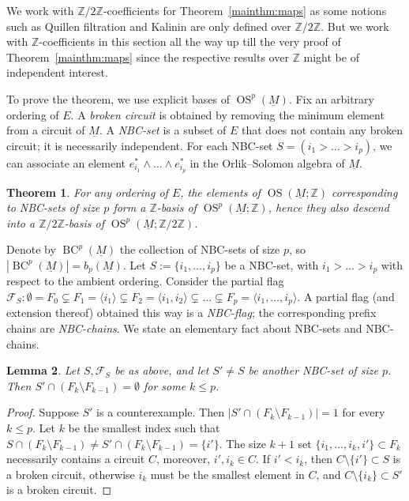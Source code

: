 \documentclass{amsart}
\newtheorem{theorem}{Theorem}[section]
\newtheorem{lemma}[theorem]{Lemma}
\newcommand\Fcal{{\mathcal F}}
\newcommand\ZZ{{\mathbb Z}}
\newcommand\Ztwo{{\mathbb Z}/2{\mathbb Z}}
\DeclareMathOperator{\OS}{OS}
\DeclareMathOperator{\BC}{BC}
\begin{document}
{We work with $\Ztwo$-coefficients for Theorem~\ref{mainthm:maps} as some notions such as Quillen filtration and Kalinin are only defined over $\Ztwo$. But we work with $\ZZ$-coefficients in this section all the way up till the very proof of Theorem~\ref{mainthm:maps} since the respective results over $\ZZ$ might be of independent interest. 

To prove the theorem, we use explicit bases of $\OS^p(\underline{M})$. 
Fix an arbitrary ordering of $E$.
A {\em broken circuit} is obtained by removing the minimum element from a circuit of $\underline{M}$.
A {\em NBC-set} is a subset of $E$ that does not contain any broken circuit; it is necessarily independent. For each NBC-set $S=(i_1>\ldots>i_p)$, we can associate an element $e^*_{i_1}\wedge\ldots\wedge e^*_{i_p}$ in the Orlik--Solomon algebra of $\underline{M}$.

\begin{theorem} \cite[Theorem~7.10.2]{Bjo92}
For any ordering of $E$, the elements of $\OS(\underline{M};\ZZ)$ corresponding to NBC-sets of size $p$ form a $\ZZ$-basis of $\OS^p(\underline{M}; \ZZ)$, hence they also descend into a $\Ztwo$-basis of $\OS^p(\underline{M}; \Ztwo)$.
\end{theorem}

Denote by $\BC^p(\underline{M})$ the collection of NBC-sets of size $p$, so $|\BC^p(\underline{M})|=b_p(\underline{M})$.
Let $S:=\{i_1,\ldots,i_p\}$ be a NBC-set, with $i_1>\ldots>i_p$ with respect to the ambient ordering.
Consider the partial flag $\Fcal_S:\emptyset=F_0 \subsetneq F_1=\langle i_1\rangle \subsetneq  F_2=\langle i_1,i_2\rangle \subsetneq \ldots \subsetneq  F_p=\langle i_1,\ldots,i_p\rangle$.
A partial flag (and extension thereof) obtained this way is a {\em NBC-flag}; the corresponding prefix chains are {\em NBC-chains}.
We state an elementary fact about NBC-sets and NBC-chains.

\begin{lemma} \label{lem:unique_NBC}
Let $S,\Fcal_S$ be as above, and let $S'\neq S$ be another NBC-set of size $p$.
Then $S'\cap(F_k\setminus F_{k-1})=\emptyset$ for some $k\leq p$.
\end{lemma}

\begin{proof}
Suppose $S'$ is a counterexample.
Then $|S'\cap(F_k\setminus F_{k-1})|=1$ for every $k\leq p$.
Let $k$ be the smallest index such that $S\cap(F_k\setminus F_{k-1})\neq S'\cap(F_k\setminus F_{k-1})=\{i'\}$.
The size $k+1$ set $\{i_1,\ldots,i_k,i'\}\subset F_k$ necessarily contains a circuit $C$, moreover, $i',i_k\in C$.
If $i'<i_k$, then $C\setminus\{i'\}\subset S$ is a broken circuit, otherwise $i_k$ must be the smallest element in $C$, and $C\setminus\{i_k\}\subset S'$ is a broken circuit.
\end{proof}

}
\end{document}

